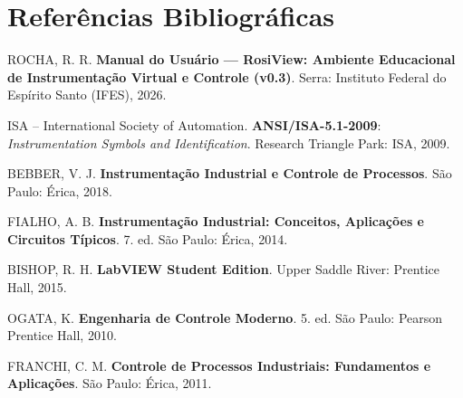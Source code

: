 \documentclass[11pt,a4paper]{article}
\begin{document}
\section{Referências Bibliográficas}

{\footnotesize
\begin{enumerate}[label={[\arabic*]}, noitemsep, topsep=0.8pt, parsep=0.3pt]
    \item ROCHA, R. R. \textbf{Manual do Usuário --- RosiView: Ambiente Educacional de Instrumentação Virtual e Controle (v0.3)}. Serra: Instituto Federal do Espírito Santo (IFES), 2026.
    \item ISA -- International Society of Automation. \textbf{ANSI/ISA-5.1-2009}: \textit{Instrumentation Symbols and Identification}. Research Triangle Park: ISA, 2009.
    \item BEBBER, V. J. \textbf{Instrumentação Industrial e Controle de Processos}. São Paulo: Érica, 2018.
    \item FIALHO, A. B. \textbf{Instrumentação Industrial: Conceitos, Aplicações e Circuitos Típicos}. 7. ed. São Paulo: Érica, 2014.
    \item BISHOP, R. H. \textbf{LabVIEW Student Edition}. Upper Saddle River: Prentice Hall, 2015.
    \item OGATA, K. \textbf{Engenharia de Controle Moderno}. 5. ed. São Paulo: Pearson Prentice Hall, 2010.
    \item FRANCHI, C. M. \textbf{Controle de Processos Industriais: Fundamentos e Aplicações}. São Paulo: Érica, 2011.
\end{enumerate}
}
\end{document}
